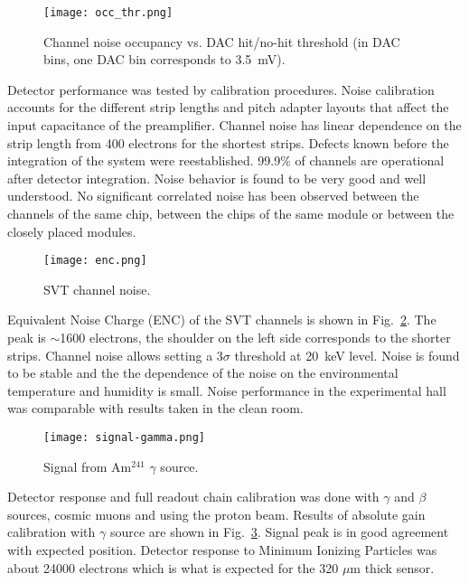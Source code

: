 \begin{figure}[hbt] 
\centering 
\texttt{[image: occ\_thr.png]}
\caption{Channel noise occupancy vs. DAC hit/no-hit threshold (in DAC bins, one DAC bin corresponds to 3.5~mV).}
\label{fig:noiseocc}
\end{figure}

Detector performance was tested by calibration procedures. Noise calibration accounts for the different strip lengths and pitch adapter layouts that affect the input capacitance of the preamplifier. Channel noise has linear dependence on the strip length from 400 electrons for the shortest strips. Defects known before the integration of the system were reestablished. 99.9$\%$ of channels are operational after detector integration. Noise behavior is found to be very good and well understood. No significant correlated noise has been observed between the channels of the same chip, between the chips of the same module or between the closely placed modules. 

\begin{figure}[hbt] 
	\centering 
	\texttt{[image: enc.png]}
	\caption{SVT channel noise.}
	\label{fig:enc}
\end{figure}

Equivalent Noise Charge (ENC) of the SVT channels is shown in  Fig.~\ref{fig:enc}. The peak is $\sim$1600 electrons, the shoulder on the left side corresponds to the shorter strips. Channel noise allows setting a 3$\sigma$ threshold at 20~keV level. Noise is found to be stable and the the dependence of the noise on the environmental temperature and humidity is small. Noise performance in the experimental hall was comparable with results taken in the clean room. 

\begin{figure}[hbt] 
	\centering 
	\texttt{[image: signal-gamma.png]}
	\caption{Signal from Am$^{241}$ $\gamma$ source.}
	\label{fig:signal-gamma}
\end{figure}

Detector response and full readout chain calibration was done with $\gamma$ and $\beta$ sources, cosmic muons and using the proton beam. Results of absolute gain calibration with $\gamma$ source are shown in Fig.~\ref{fig:signal-gamma}. Signal peak is in good agreement with expected position. Detector response to Minimum Ionizing Particles was about 24000 electrons which is what is expected for the 320 $\mu$m thick sensor.
%
%

